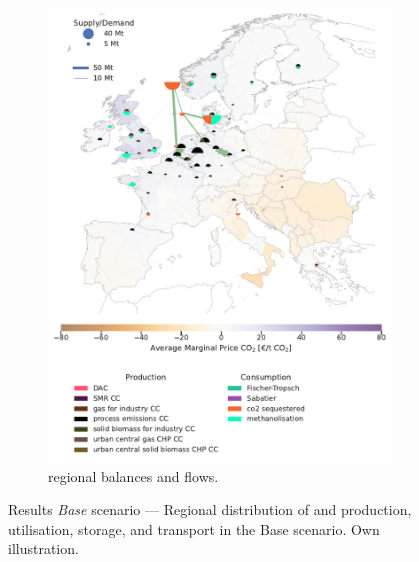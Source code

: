 \documentclass[final,5p,times,twocolumn]{elsarticle}
\begin{document}
\begin{figure}[!htbp]
\begin{subfigure}[t]{0.47\textwidth}
      \includegraphics[width=\textwidth]{balance_map_co2_base} %
      \caption{ regional balances and flows.}
      \label{fig:balance_map_co2_base}
  \end{subfigure}
  \caption{Results \textit{Base} scenario --- Regional distribution of  and  production, utilisation, storage, and transport in the Base scenario. Own illustration.}
  \label{fig:balance_maps_base}
\end{figure}
\end{document}
